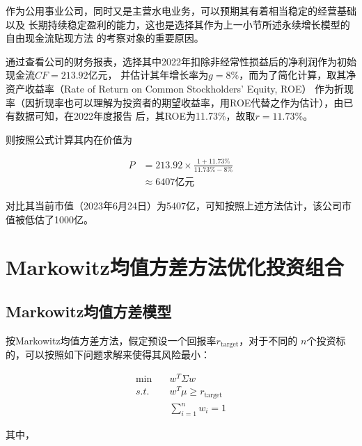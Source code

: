 \documentclass[UTF8]{ctexart}
\numberwithin{figure}{section}
\numberwithin{table}{section}
\numberwithin{equation}{section}
\begin{document}
        作为公用事业公司，同时又是主营水电业务，可以预期其有着相当稳定的经营基础以及
    长期持续稳定盈利的能力，这也是选择其作为上一小节所述永续增长模型的自由现金流贴现方法
    的考察对象的重要原因。

        通过查看公司的财务报表，选择其中2022年扣除非经常性损益后的净利润作为初始现金流$CF=213.92$亿元，
    并估计其年增长率为$g=8\%$，而为了简化计算，取其净资产收益率（Rate of Return on Common Stockholders’ Equity, ROE）
    作为折现率（因折现率也可以理解为投资者的期望收益率，用ROE代替之作为估计），由已有数据可知，在2022年度报告
    后，其ROE为11.73\%，故取$r = 11.73\%$。

        则按照公式计算其内在价值为

        \begin{equation}
            \begin{aligned}
                P &= 213.92 \times \frac{1 + 11.73\%}{11.73\% - 8\%} \\
                    &\approx 6407 \text{亿元}
            \end{aligned}
        \end{equation}

        对比其当前市值（2023年6月24日）为5407亿，可知按照上述方法估计，该公司市值被低估了1000亿。


        
\newpage



\section{Markowitz均值方差方法优化投资组合}
    \subsection{Markowitz均值方差模型}
        按Markowitz均值方差方法，假定预设一个回报率$r_{\text{target}}$，对于不同的
    $n$个投资标的，可以按照如下问题求解来使得其风险最小：

    \begin{equation}
        \begin{aligned}
            \text{min} \quad & w^T \Sigma w \\
            s.t. \quad & w^T \mu \geq r_{\text{target}} \\
            & \sum_{i = 1}^{n}w_i = 1
        \end{aligned}
    \end{equation}

        其中，
\end{document}
